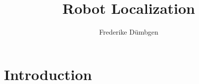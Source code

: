 \documentclass[a4paper]{flex}
\title{Robot Localization}
\author{Frederike Dümbgen}
\begin{document}
\maketitle

\section{Introduction}
%






\newpage

{}
\end{document}
